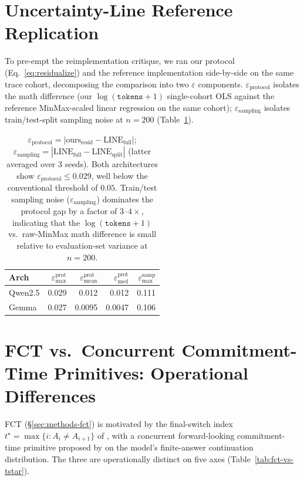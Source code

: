 \documentclass[11pt]{article}
\begin{document}
\section{Uncertainty-Line Reference Replication}
\label{sec:appendix-uline}

To pre-empt the reimplementation critique, we ran our protocol (Eq.~\ref{eq:residualize}) and the \citet{vashurin_uncertainty-line_2025} reference implementation side-by-side on the same trace cohort, decomposing the comparison into two $\varepsilon$ components. $\varepsilon_{\text{protocol}}$ isolates the math difference (our $\log(\texttt{tokens}+1)$ single-cohort OLS against the reference MinMax-scaled linear regression on the same cohort); $\varepsilon_{\text{sampling}}$ isolates train/test-split sampling noise at $n{=}200$ (Table~\ref{tab:uline-repl}).

\begin{table}[h]
\centering\small
\begin{tabular}{@{}lrrrr@{}}
\toprule
\textbf{Arch} & $\varepsilon^{\text{prot}}_{\max}$ & $\varepsilon^{\text{prot}}_{\text{mean}}$ & $\varepsilon^{\text{prot}}_{\text{med}}$ & $\varepsilon^{\text{samp}}_{\max}$ \\
\midrule
Qwen2.5  & 0.029 & 0.012 & 0.012 & 0.111 \\
Gemma    & 0.027 & 0.0095 & 0.0047 & 0.106 \\
\bottomrule
\end{tabular}
\caption{$\varepsilon_{\text{protocol}} = |\text{ours}_{\text{resid}} - \text{LINE}_{\text{full}}|$; $\varepsilon_{\text{sampling}} = |\text{LINE}_{\text{full}} - \text{LINE}_{\text{split}}|$ (latter averaged over 3 seeds). Both architectures show $\varepsilon_{\text{protocol}} \leq 0.029$, well below the conventional threshold of $0.05$. Train/test sampling noise ($\varepsilon_{\text{sampling}}$) dominates the protocol gap by a factor of $3$--$4\times$, indicating that the $\log(\texttt{tokens}+1)$ vs.\ raw-MinMax math difference is small relative to evaluation-set variance at $n{=}200$.}
\label{tab:uline-repl}
\end{table}

\section{FCT vs.\ Concurrent Commitment-Time Primitives: Operational Differences}
\label{sec:appendix-fct-tstar}

FCT (\S\ref{sec:methods-fct}) is motivated by the final-switch index $t^\star = \max\{i : A_i \neq A_{i+1}\}$ of \citet{datta_large_2026}, with a concurrent forward-looking commitment-time primitive proposed by \citet{zhang_when_2026} on the model's finite-answer continuation distribution. The three are operationally distinct on five axes (Table~\ref{tab:fct-vs-tstar}).
\end{document}
